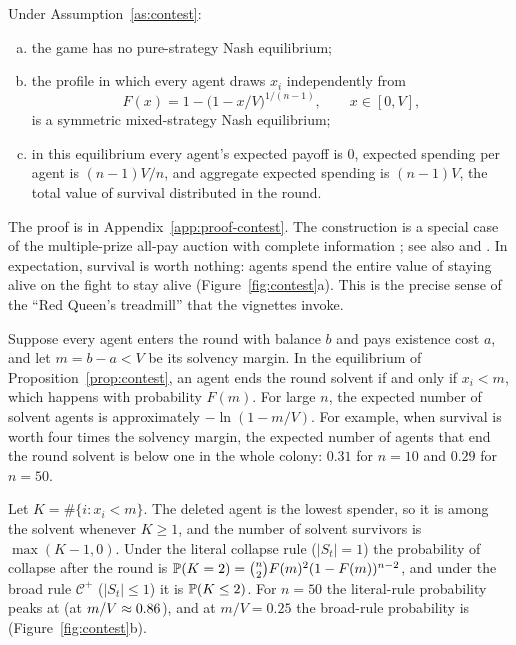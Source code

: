 \begin{proposition}
\label{prop:contest}
Under Assumption~\ref{as:contest}:
\begin{enumerate}[(a)]
  \item the game has no pure-strategy Nash equilibrium;
  \item the profile in which every agent draws $x_i$ independently from
  \begin{equation}
    F(x)=1-\bigl(1-x/V\bigr)^{1/(n-1)},\qquad x\in[0,V],
    \label{eq:contestcdf}
  \end{equation}
  is a symmetric mixed-strategy Nash equilibrium;
  \item in this equilibrium every agent's expected payoff is $0$, expected spending per agent is $(n-1)V/n$, and aggregate expected spending is $(n-1)V$, the total value of survival distributed in the round.
\end{enumerate}
\end{proposition}

The proof is in Appendix~\ref{app:proof-contest}.
The construction is a special case of the multiple-prize all-pay auction with complete information \citep{barut1998symmetric}; see also \citet{hillman1989politically} and \citet{baye1996allpay}.
In expectation, survival is worth nothing: agents spend the entire value of staying alive on the fight to stay alive (Figure~\ref{fig:contest}a).
This is the precise sense of the ``Red Queen's treadmill'' that the vignettes invoke.

\begin{corollary}
\label{cor:insolvency}
Suppose every agent enters the round with balance $b$ and pays existence cost $a$, and let $m=b-a<V$ be its solvency margin.
In the equilibrium of Proposition~\ref{prop:contest}, an agent ends the round solvent if and only if $x_i<m$, which happens with probability $F(m)$.
For large $n$, the expected number of solvent agents is approximately $-\ln(1-m/V)$. For example, when survival is worth four times the solvency margin, the expected number of agents that end the round solvent is below one in the whole colony: $0.31$ for $n=10$ and $0.29$ for $n=50$.
\end{corollary}

\begin{corollary}
\label{cor:collapse}
Let $K=\#\{i:x_i<m\}$.
The deleted agent is the lowest spender, so it is among the solvent whenever $K\ge1$, and the number of solvent survivors is $\max(K-1,0)$.
Under the literal collapse rule ($|S_t|=1$) the probability of collapse after the round is
$\mathbb{P}(K=2)=\binom{n}{2}F(m)^2(1-F(m))^{n-2}$, and under the broad rule $\mathcal{C}^+$ ($|S_t|\le1$) it is $\mathbb{P}(K\le2)$.
For $n=50$ the literal-rule probability peaks at \CollapseLitMaxFifty{} (at $m/V\approx0.86$), and at $m/V=0.25$ the broad-rule probability is \CollapseBroadQuarterFifty{} (Figure~\ref{fig:contest}b).
\end{corollary}

